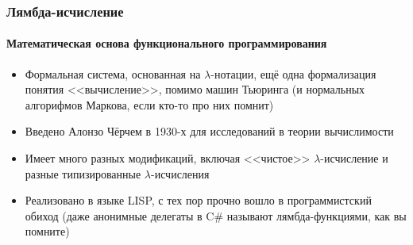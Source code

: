\documentclass[xetex,mathserif,serif]{beamer}
\begin{document}
	\begin{frame}
		\frametitle{Лямбда-исчисление}
		\framesubtitle{Математическая основа функционального программирования}
		\begin{itemize}
			\item Формальная система, основанная на $\lambda$-нотации, ещё одна формализация
					понятия <<вычисление>>, помимо машин Тьюринга (и нормальных алгорифмов
					Маркова, если кто-то про них помнит)
			\item Введено Алонзо Чёрчем в 1930-х для исследований в теории вычислимости
			\item Имеет много разных модификаций, включая <<чистое>> $\lambda$-исчисление и
					разные типизированные $\lambda$-исчисления
			\item Реализовано в языке LISP, с тех пор прочно вошло в программистский обиход
					(даже анонимные делегаты в C\# называют лямбда-функциями, как вы помните)
		\end{itemize}
	\end{frame}
	
\end{document}
